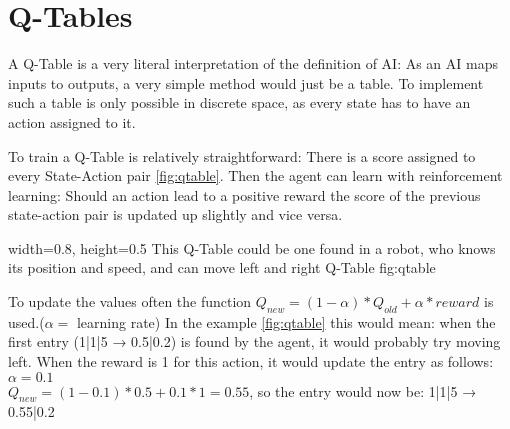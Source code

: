 \section{Q-Tables}
\label{sec:QTable}
A Q-Table is a very literal interpretation of the definition of AI: As an AI maps inputs to outputs, a very simple method would just be a table. To implement such a table is only possible in discrete space, as every state has to have an action assigned to it.

To train a Q-Table is relatively straightforward: There is a score assigned to every State-Action pair \autoref{fig:qtable}. Then the agent can learn with reinforcement learning: Should an action lead to a positive reward the score of the previous state-action pair is updated up slightly and vice versa.

    {width=0.8\textwidth, height=0.5\textheight} %
    {This Q-Table could be one found in a robot, who knows its position and speed, and can move left and right}   %
    {Q-Table}   %
    {fig:qtable}    %

To update the values often the function $Q_{new}=(1-\alpha)*Q_{old}+\alpha*reward$ is used.($\alpha=$ learning rate)
In the example \autoref{fig:qtable} this would mean: when the first entry (1|1|5 → 0.5|0.2) is found by the agent, it would probably try moving left. When the reward is 1 for this action, it would update the entry as follows: $\alpha=0.1$\\$Q_{new}=(1-0.1)*0.5+0.1*1=0.55$, so the entry would now be: 1|1|5 → 0.55|0.2

